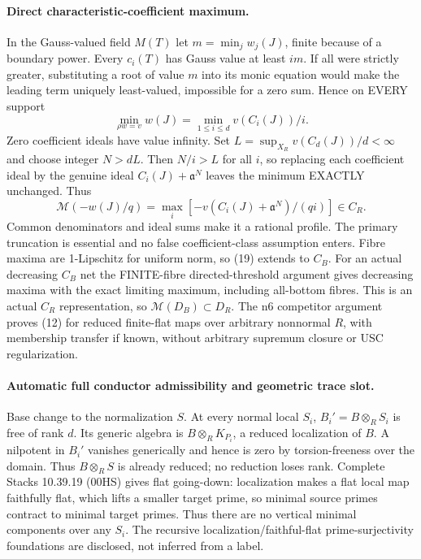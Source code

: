 \documentclass[11pt]{article}
\begin{document}
\paragraph{Direct characteristic-coefficient maximum.}
In the Gauss-valued field $M(T)$ let $m=\min_jw_j(J)$, finite because of a boundary power. Every $c_i(T)$ has Gauss value at least $im$. If all were strictly greater, substituting a root of value $m$ into its monic equation would make the leading term uniquely least-valued, impossible for a zero sum. Hence on EVERY support
\[
 \min_{\rho w=v}w(J)=\min_{1\le i\le d}v(C_i(J))/i. \tag{18}
\]
Zero coefficient ideals have value infinity. Set $L=\sup_{X_R}v(C_d(J))/d<\infty$ and choose integer $N>dL$. Then $N/i>L$ for all $i$, so replacing each coefficient ideal by the genuine ideal $C_i(J)+\mathfrak a^N$ leaves the minimum EXACTLY unchanged. Thus
\[
 \mathcal M(-w(J)/q)
 =\max_i[-v(C_i(J)+\mathfrak a^N)/(qi)]\in C_R. \tag{19}
\]
Common denominators and ideal sums make it a rational profile. The primary truncation is essential and no false coefficient-class assumption enters. Fibre maxima are 1-Lipschitz for uniform norm, so (19) extends to $C_B$. For an actual decreasing $C_B$ net the FINITE-fibre directed-threshold argument gives decreasing maxima with the exact limiting maximum, including all-bottom fibres. This is an actual $C_R$ representation, so $\mathcal M(D_B)\subset D_R$. The n6 competitor argument proves (12) for reduced finite-flat maps over arbitrary nonnormal $R$, with membership transfer if known, without arbitrary supremum closure or USC regularization.

\paragraph{Automatic full conductor admissibility and geometric trace slot.}
Base change to the normalization $S$. At every normal local $S_i$, $B_i'=B\otimes_RS_i$ is free of rank $d$. Its generic algebra is $B\otimes_RK_{P_i}$, a reduced localization of $B$. A nilpotent in $B_i'$ vanishes generically and hence is zero by torsion-freeness over the domain. Thus $B\otimes_RS$ is already reduced; no reduction loses rank. Complete Stacks 10.39.19 (00HS) gives flat going-down: localization makes a flat local map faithfully flat, which lifts a smaller target prime, so minimal source primes contract to minimal target primes. Thus there are no vertical minimal components over any $S_i$. The recursive localization/faithful-flat prime-surjectivity foundations are disclosed, not inferred from a label.
\end{document}
